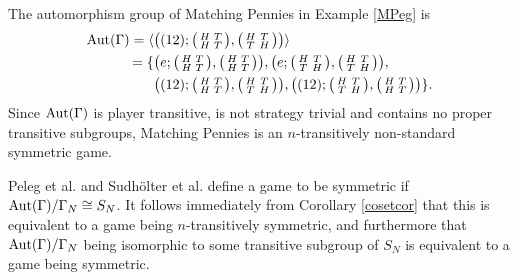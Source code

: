 \begin{example} The automorphism group of Matching Pennies in Example \ref{MPeg} is \begin{align*}
		\operatorname*{Aut}(\Gamma) = \langle &\bigl((12) ; \bigl(\begin{smallmatrix} H & T \\ H & T \end{smallmatrix}\bigr), \bigl(\begin{smallmatrix} H & T \\ T & H \end{smallmatrix}\bigr)\bigr)\rangle \\
		= \{ &\bigl(e ; \bigl(\begin{smallmatrix} H & T \\ H & T \end{smallmatrix}\bigr), \bigl(\begin{smallmatrix} H & T \\ H & T \end{smallmatrix}\bigr)\bigr), 
		\bigl(e ; \bigl(\begin{smallmatrix} H & T \\ T & H \end{smallmatrix}\bigr), \bigl(\begin{smallmatrix} H & T \\ T & H \end{smallmatrix}\bigr)\bigr), \\
		&\bigl((12) ; \bigl(\begin{smallmatrix} H & T \\ H & T \end{smallmatrix}\bigr), \bigl(\begin{smallmatrix} H & T \\ T & H \end{smallmatrix}\bigr)\bigr),
		\bigl((12) ; \bigl(\begin{smallmatrix} H & T \\ T & H \end{smallmatrix}\bigr), \bigl(\begin{smallmatrix} H & T \\ H & T \end{smallmatrix}\bigr)\bigr) \}.
	\end{align*}
	Since $\operatorname*{Aut}(\Gamma)$ is player transitive, is not strategy trivial and contains no proper transitive subgroups, Matching Pennies is an $n$-transitively non-standard symmetric game.
\end{example}

Peleg et al. \cite{peleg1999canonical} and Sudh\"{o}lter et al. \cite{sudholter2000canonical} define a game to be symmetric if $\operatorname*{Aut}(\Gamma)/\Gamma_N \cong S_N$. It follows immediately from Corollary \ref{cosetcor} that this is equivalent to a game being $n$-transitively symmetric, and furthermore that $\operatorname*{Aut}(\Gamma)/\Gamma_N$ being isomorphic to some transitive subgroup of $S_N$ is equivalent to a game being symmetric.

